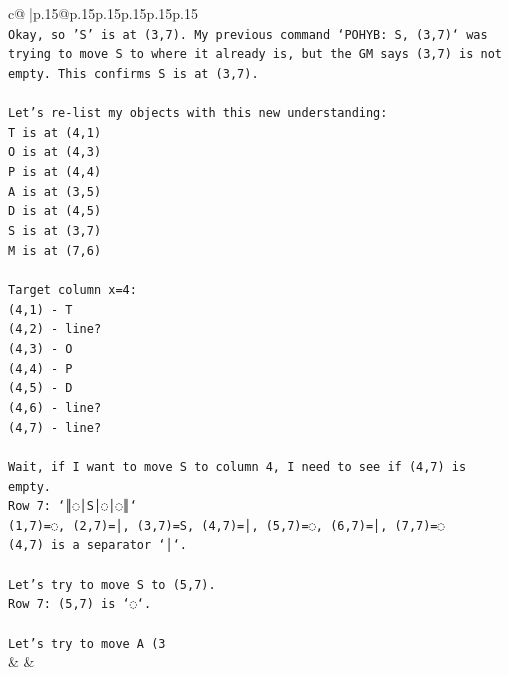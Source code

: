 \documentclass{article}
\begin{document}
{\begin{supertabular}{c@{$\;$}|p{.15\linewidth}@{}p{.15\linewidth}p{.15\linewidth}p{.15\linewidth}p{.15\linewidth}p{.15\linewidth}}
{{{\\ 
\texttt{Okay, so 'S' is at (3,7). My previous command `POHYB: S, (3,7)` was trying to move S to where it already is, but the GM says (3,7) is not empty. This confirms S is at (3,7).} \\
\\ 
\texttt{Let's re{-}list my objects with this new understanding:} \\
\texttt{T is at (4,1)} \\
\texttt{O is at (4,3)} \\
\texttt{P is at (4,4)} \\
\texttt{A is at (3,5)} \\
\texttt{D is at (4,5)} \\
\texttt{S is at (3,7)} \\
\texttt{M is at (7,6)} \\
\\ 
\texttt{Target column x=4:} \\
\texttt{(4,1) {-} T} \\
\texttt{(4,2) {-} line?} \\
\texttt{(4,3) {-} O} \\
\texttt{(4,4) {-} P} \\
\texttt{(4,5) {-} D} \\
\texttt{(4,6) {-} line?} \\
\texttt{(4,7) {-} line?} \\
\\ 
\texttt{Wait, if I want to move S to column 4, I need to see if (4,7) is empty.} \\
\texttt{Row 7: `║◌│S│◌│◌║`} \\
\texttt{(1,7)=◌, (2,7)=│, (3,7)=S, (4,7)=│, (5,7)=◌, (6,7)=│, (7,7)=◌} \\
\texttt{(4,7) is a separator `│`.} \\
\\ 
\texttt{Let's try to move S to (5,7).} \\
\texttt{Row 7: (5,7) is `◌`.} \\
\\ 
\texttt{Let's try to move A (3} \\
            }
        }
    }
    & & \\ \\


\end{supertabular}}
\end{document}
